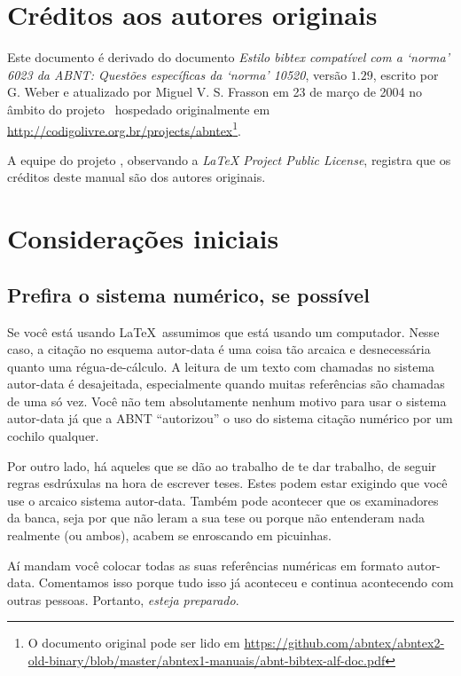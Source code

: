 \documentclass[a4paper]{ltxdoc}
\begin{document}
\section{Créditos aos autores originais}

Este documento é derivado do documento \emph{Estilo bibtex compatível com a
`norma' 6023 da ABNT: Questões específicas da `norma' 10520}, versão $ 1.29
$, escrito por G. Weber e atualizado por Miguel V. S. Frasson em 23 de março de
2004 no âmbito do projeto \abnTeX\ hospedado originalmente em
\url{http://codigolivre.org.br/projects/abntex}\footnote{O documento original pode ser lido em
\url{https://github.com/abntex/abntex2-old-binary/blob/master/abntex1-manuais/abnt-bibtex-alf-doc.pdf}}.

A equipe do projeto , observando a \emph{LaTeX Project Public License},
registra que os créditos deste manual são dos autores originais.


\section{Considerações iniciais}

\subsection{Prefira o sistema numérico, se possível}

Se você está usando \LaTeX\, assumimos que está usando um computador. Nesse
caso, a citação no esquema autor-data é uma coisa tão arcaica e desnecessária
quanto uma régua-de-cálculo. A leitura de um texto com chamadas no sistema
autor-data é desajeitada, especialmente quando muitas referências são chamadas
de uma só vez. Você não tem absolutamente nenhum motivo para usar o sistema
autor-data já que a ABNT ``autorizou'' o uso do sistema citação numérico
por um cochilo qualquer.

Por outro lado, há aqueles que se dão ao trabalho de te dar trabalho, de seguir
regras esdrúxulas na hora de escrever teses. Estes podem estar exigindo que você
use o arcaico sistema autor-data. Também pode acontecer que os examinadores da
banca, seja por que não leram a sua tese ou porque não entenderam nada
realmente (ou ambos), acabem se enroscando em picuinhas.

Aí mandam você colocar todas as suas referências numéricas em formato
autor-data. Comentamos isso porque tudo isso já aconteceu e continua acontecendo 
com outras pessoas. Portanto, \emph{esteja preparado}. 
\end{document}
